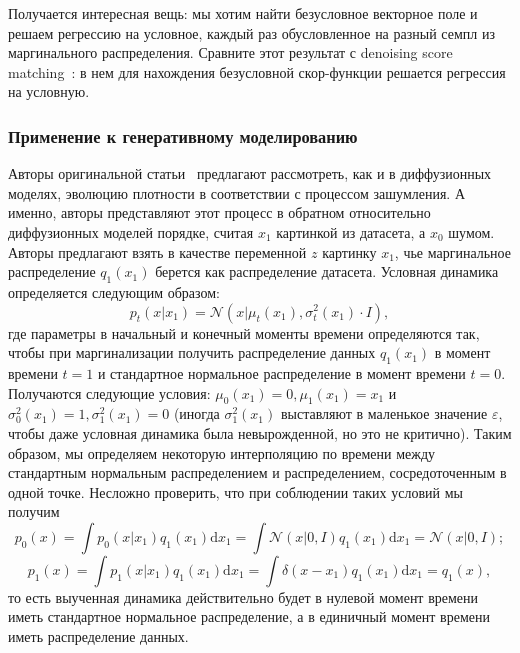 \documentclass[12pt]{article}
\theoremstyle{definition}
\begin{document}
Получается интересная вещь: мы хотим найти безусловное векторное поле и решаем регрессию на условное, каждый раз обусловленное на разный семпл из маргинального распределения. Сравните этот результат с denoising score matching~\cite{song2019generative}: в нем для нахождения безусловной скор-функции решается регрессия на условную.

\subsubsection{Применение к генеративному моделированию}

Авторы оригинальной статьи~\cite{lipman2022flow} предлагают рассмотреть, как и в диффузионных моделях, эволюцию плотности в соответствии с процессом зашумления. А именно, авторы представляют этот процесс в обратном относительно диффузионных моделей порядке, считая $x_1$ картинкой из датасета, а $x_0$ шумом. Авторы предлагают взять в качестве переменной $z$ картинку $x_1$, чье маргинальное распределение $q_1(x_1)$ берется как распределение датасета. Условная динамика определяется следующим образом:
\[
    p_t(x | x_1) = \mathcal{N}\left(x | \mu_t(x_1), \sigma^2_t(x_1) \cdot I \right),
\]
где параметры в начальный и конечный моменты времени определяются так, чтобы при маргинализации получить распределение данных $q_1(x_1)$ в момент времени $t = 1$ и стандартное нормальное распределение в момент времени $t = 0$. Получаются следующие условия: $\mu_0(x_1) = 0, \mu_1(x_1) = x_1$ и $\sigma_0^2(x_1) = 1, \sigma_1^2(x_1) = 0$ (иногда $\sigma_1^2(x_1)$ выставляют в маленькое значение $\varepsilon$, чтобы даже условная динамика была невырожденной, но это не критично). Таким образом, мы определяем некоторую интерполяцию по времени между стандартным нормальным распределением и распределением, сосредоточенным в одной точке. Несложно проверить, что при соблюдении таких условий мы получим
\[
    p_0(x) = \int p_0(x | x_1) q_1(x_1) \mathrm{d} x_1 = \int \mathcal{N}(x | 0, I) q_1(x_1) \mathrm{d} x_1 = \mathcal{N}(x | 0, I);
\]
\[
    p_1(x) = \int p_1(x | x_1)q_1(x_1) \mathrm{d} x_1 = \int \delta(x - x_1) q_1(x_1) \mathrm{d} x_1 = q_1(x),
\]
то есть выученная динамика действительно будет в нулевой момент времени иметь стандартное нормальное распределение, а в единичный момент времени иметь распределение данных.
\end{document}
